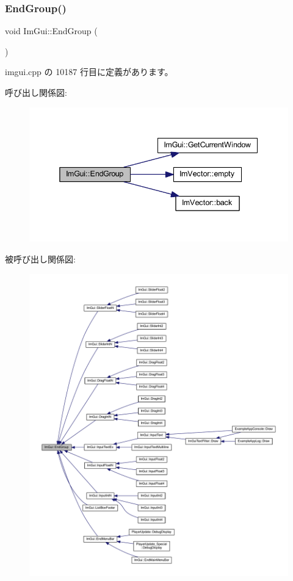 \subsubsection{\texorpdfstring{End\+Group()}{EndGroup()}}
{\footnotesize\ttfamily void Im\+Gui\+::\+End\+Group (\begin{DoxyParamCaption}{ }\end{DoxyParamCaption})}



 imgui.\+cpp の 10187 行目に定義があります。

呼び出し関係図\+:\nopagebreak
\begin{figure}[H]
\begin{center}
\leavevmode
\includegraphics[width=338pt]{namespace_im_gui_a05fc97fc64f28a55486087f503d9a622_cgraph}
\end{center}
\end{figure}
被呼び出し関係図\+:\nopagebreak
\begin{figure}[H]
\begin{center}
\leavevmode
\includegraphics[width=350pt]{namespace_im_gui_a05fc97fc64f28a55486087f503d9a622_icgraph}
\end{center}
\end{figure}
